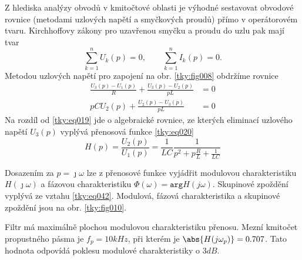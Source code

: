 \begin{tkyexam}
    {\centering
    \captionsetup{type=figure}
    \label{tky:fig009}
    \par}
  
  Z hlediska analýzy obvodů v kmitočtové oblasti je výhodné sestavovat obvodové rovnice (metodami
  uzlových napětí a smyčkových proudů) přímo v operátorovém tvaru. Kirchhoffovy zákony pro uzavřenou
  smyčku a proudu do uzlu pak mají tvar $$\sum_{k=1}^{n}U_k(p) = 0, \qquad \sum_{k=1}^{n}I_k(p) =
  0.$$ Metodou uzlových napětí pro zapojení na obr. \ref{tky:fig008} obdržíme rovnice
  \begin{align}
    \frac{U_3(p)-U_1(p)}{R}+\frac{U_3(p)-U_2(p)}{pL} &=  0 \\
    pCU_2(p) + \frac{U_2(p)-U_3(p)}{pL}              &=  0 
  \end{align}
  Na rozdíl od \ref{tky:eq019} jde o algebraické rovnice, ze kterých eliminací uzlového napětí
  $U_3(p)$ vyplývá přenosová funkce \ref{tky:eq020} $$H(p) = \frac{U_2(p)}{U_1(p)} =
  \frac{1}{LC}\frac{1}{p^2+p\frac{R}{L} + \frac{1}{LC}}$$
  
  {\centering
    \captionsetup{type=figure}
    \label{tky:fig010}
    \par}    
  
  Dosazením za $p=\jmath\omega$ lze z přenosové funkce vyjádřit modulovou charakteristiku
  $H(\jmath\omega)$ a fázovou charakteristiku $\Phi(\omega)= \texttt{arg} H(j\omega)$. Skupinové
  zpoždění vyplývá ze vztahu \ref{tky:eq042}. Modulová, fázová charakteristika a skupinové zpoždění
  jsou na obr. \ref{tky:fig010}.
  
  Filtr má maximálně plochou modulovou charakteristiku přenosu. Mezní kmitočet propustného pásma je
  $f_p = 10 kHz$, při kterém je $\abs{H(j\omega_p)}= 0.707$. Tato hodnota odpovídá poklesu modulové
  charakteristiky o $3 dB$.
    
  
  
\end{tkyexam}